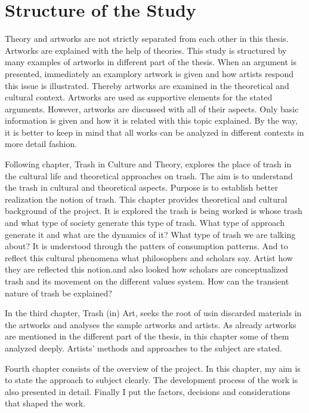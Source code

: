 %
\section{Structure of the Study}
Theory and artworks are not strictly separated from each other in this thesis. Artworks are explained with the help of theories. This study is structured by many examples of artworks in different part of the thesis. When an argument is presented, immediately an examplory artwork is given and how artists respond this issue is illustrated. Thereby artworks are examined in the theoretical and cultural context. Artworks are used as supportive elements for the stated arguments. However, artworks are discussed with all of their aspects. Only basic information is given and how it is related with this topic explained. By the way, it is better to keep in mind that all works can be analyzed in different contexts in more detail fashion.


Following chapter, Trash in Culture and Theory, explores the place of trash in the cultural life and theoretical approaches on trash. The aim is to understand the trash in cultural and theoretical aspects. Purpose is to establish better realization the notion of trash. This chapter provides theoretical and cultural background of the project. It is explored the trash is being worked is whose trash and what type of society generate this type of trash. What type of approach generate it and what are the dynamics of it? What type of trash we are talking about? It is understood through the patters of consumption patterns. And to reflect this cultural phenomena what philosophers and scholars say. Artist how they are reflected this notion.and also looked how scholars are conceptualized trash and its movement on the different values system. How can the transient nature of trash be explained?

In the third chapter, Trash (in) Art, seeks the root of usin discarded materials in the artworks and analyses the sample artworks and artists. As already artworks are mentioned in the different part of the thesis, in this chapter some of them analyzed deeply. Artists' methods and approaches to the subject are stated.

Fourth chapter consists of the overview of the project. In this chapter, my aim is to state the approach to subject clearly. The development process of the work is also presented in detail. Finally I put the factors, decisions and considerations that shaped the work.

